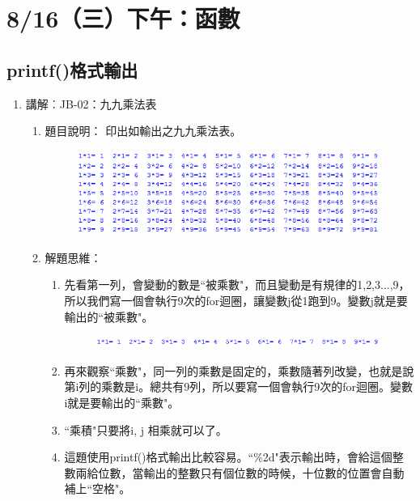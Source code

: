 
\section{8/16（三）下午：函數}
\subsection{printf()格式輸出}
\begin{enumerate}
	\item 講解︰JB-02：九九乘法表
		\begin{enumerate}
			\item 題目說明：
			\subitem 印出如輸出之九九乘法表。
			\begin{figure}[h]
				\centering
				\includegraphics[width=12cm]{fig/JB02fig}
			\end{figure}
			\item 解題思維：
			\begin{enumerate}
				\item 先看第一列，會變動的數是``被乘數"，而且變動是有規律的1,2,3...,9，所以我們寫一個會執行9次的for迴圈，讓變數j從1跑到9。變數j就是要輸出的``被乘數"。
				\begin{figure}[H]
					\centering
					\includegraphics[width=12cm]{fig/JB02fig_2}
				\end{figure}
				\item 再來觀察``乘數"，同一列的乘數是固定的，乘數隨著列改變，也就是說第i列的乘數是i。總共有9列，所以要寫一個會執行9次的for迴圈。變數i就是要輸出的``乘數"。
				\item ``乘積"只要將i, j 相乘就可以了。
				\item 這題使用printf()格式輸出比較容易。``\%2d"表示輸出時，會給這個整數兩給位數，當輸出的整數只有個位數的時候，十位數的位置會自動補上``空格"。
			\end{enumerate}
			

\end{enumerate}
\end{enumerate}
